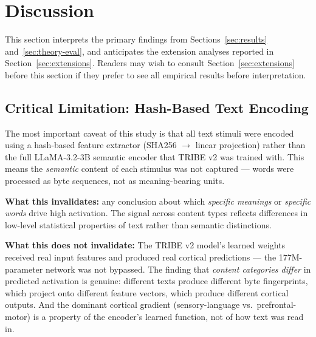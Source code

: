 \documentclass[11pt,letterpaper]{article}
\begin{document}
\FloatBarrier
\clearpage
\section{Discussion}

This section interprets the primary findings from Sections~\ref{sec:results} and~\ref{sec:theory-eval}, and anticipates the extension analyses reported in Section~\ref{sec:extensions}. Readers may wish to consult Section~\ref{sec:extensions} before this section if they prefer to see all empirical results before interpretation.

\subsection{Critical Limitation: Hash-Based Text Encoding}\label{sec:caveat}

The most important caveat of this study is that all text stimuli were encoded using a hash-based feature extractor (SHA256 $\rightarrow$ linear projection) rather than the full LLaMA-3.2-3B semantic encoder that TRIBE v2 was trained with. This means the \textit{semantic} content of each stimulus was not captured --- words were processed as byte sequences, not as meaning-bearing units.

\begin{quotebox}
\textbf{What this invalidates:} any conclusion about which \textit{specific meanings} or \textit{specific words} drive high activation. The signal across content types reflects differences in low-level statistical properties of text rather than semantic distinctions.
\end{quotebox}

\begin{quotebox}
\textbf{What this does not invalidate:} The TRIBE v2 model's learned weights received real input features and produced real cortical predictions --- the 177M-parameter network was not bypassed. The finding that \textit{content categories differ} in predicted activation is genuine: different texts produce different byte fingerprints, which project onto different feature vectors, which produce different cortical outputs. And the dominant cortical gradient (sensory-language vs.\ prefrontal-motor) is a property of the encoder's learned function, not of how text was read in.
\end{quotebox}
\end{document}
